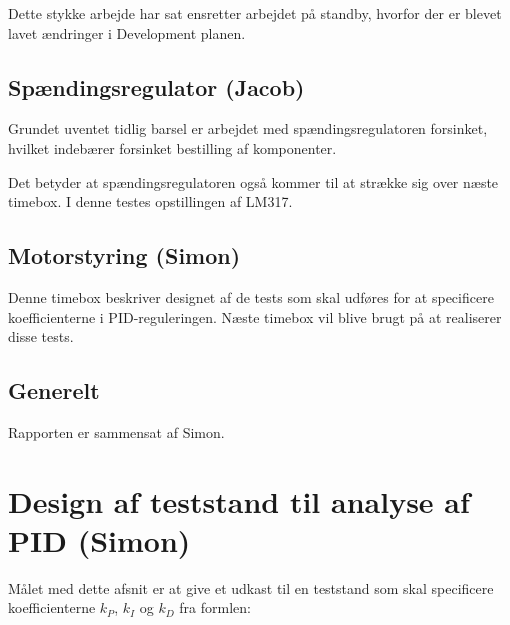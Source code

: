 Dette stykke arbejde har sat ensretter arbejdet på standby, hvorfor der er blevet lavet ændringer i Development planen.

\subsection{Spændingsregulator (Jacob)}
\label{sec:spand-jacob}
Grundet uventet tidlig barsel er arbejdet med spændingsregulatoren forsinket, hvilket indebærer forsinket bestilling af komponenter.

Det betyder at spændingsregulatoren også kommer til at strække sig over næste timebox. I denne testes opstillingen af LM317.

\subsection{Motorstyring (Simon)}
\label{sec:motorstyring-simon}
Denne timebox beskriver designet af de tests som skal udføres for at specificere koefficienterne i PID-reguleringen. Næste timebox vil blive brugt på at realiserer disse tests.

\subsection{Generelt}
\label{sec:generelt}

Rapporten er sammensat af Simon.
\section{Design af teststand til analyse af PID (Simon)}
\label{sec:design-af-teststand}

Målet med dette afsnit er at give et udkast til en teststand som skal specificere koefficienterne $k_P$, $k_I$ og $k_D$ fra formlen:


